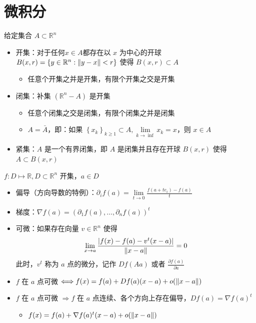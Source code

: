 \section{微积分}
\begin{remark}
    给定集合 $A \subset \mathbb{R}^n$\begin{itemize}
        \item 开集：对于任何$x \in A$都存在以 $x$ 为中心的开球 $B(x, r) = \left\{y \in \mathbb{R}^n: \norm{y - x} < r\right\}$ 使得 $B(x, r) \subset A$\begin{itemize}
            \item 任意个开集之并是开集，有限个开集之交是开集
        \end{itemize}
        \item 闭集：补集 $(\mathbb{R}^n - A)$ 是开集\begin{itemize}
            \item 任意个闭集之交是闭集，有限个闭集之并是闭集
            \item $A = \bar{A}$，即：如果 $\left\{x_k\right\}_{k \ge 1} \subset A,\underset{k \to \inf}{\lim}x_k = x$，则 $x \in A$
        \end{itemize}
        \item  紧集：$A$ 是一个有界闭集，即 $A$ 是闭集并且存在开球 $B(x, r)$ 使得 $A \subset B(x, r)$
    \end{itemize}
\end{remark}

\begin{remark}
    $f: D \mapsto \mathbb{R}, D \subset \mathbb{R}^n$ 开集，$a \in D$\begin{itemize}
        \item 偏导（方向导数的特例）：$\partial_if(a) = \underset{t \to 0}{\lim}\frac{f(a + te_i) - f(a)}{t}$
        \item 梯度：$\nabla f(a) = (\partial_1f(a), \dots, \partial_nf(a))^t$
        \item 可微：如果存在向量 $v \in \mathbb{R}^n$ 使得\[\lim_{x \to a}\frac{|f(x) - f(a) - v^t(x - a)|}{\norm{x - a}} = 0\]此时，$v^t$ 称为 $a$ 点的微分，记作 $Df(Aa)$ 或者 $\frac{\partial f(a)}{\partial a}$
        \item $f$ 在 $a$ 点可微 $\Longleftrightarrow f(x) = f(a) + Df(a)(x - a) + o(\norm{x - a})$
        \item $f$ 在 $a$ 点可微 $\Longrightarrow f$ 在 $a$ 点连续、各个方向上存在偏导，$Df(a) = \nabla f(a)^t$\begin{itemize}
            \item $f(x) = f(a) + \nabla f(a)^t(x - a) + o(\norm{x - a})$
        \end{itemize} 
    \end{itemize}
\end{remark}

